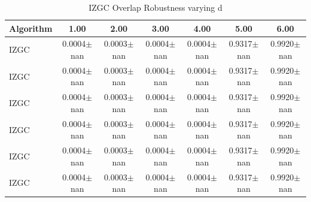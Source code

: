 \begin{table}[ht!]
\centering
\caption{IZGC Overlap Robustness varying d}
\label{tab:izgc_overlap_d}
\begin{tabular*}{\linewidth}{@{} lcccccc @{}}
\toprule
Algorithm & 1.00 & 2.00 & 3.00 & 4.00 & 5.00 & 6.00 \\
\midrule
IZGC & 0.0004$\pm$nan & 0.0003$\pm$nan & 0.0004$\pm$nan & 0.0004$\pm$nan & 0.9317$\pm$nan & 0.9920$\pm$nan \\
IZGC & 0.0004$\pm$nan & 0.0003$\pm$nan & 0.0004$\pm$nan & 0.0004$\pm$nan & 0.9317$\pm$nan & 0.9920$\pm$nan \\
IZGC & 0.0004$\pm$nan & 0.0003$\pm$nan & 0.0004$\pm$nan & 0.0004$\pm$nan & 0.9317$\pm$nan & 0.9920$\pm$nan \\
IZGC & 0.0004$\pm$nan & 0.0003$\pm$nan & 0.0004$\pm$nan & 0.0004$\pm$nan & 0.9317$\pm$nan & 0.9920$\pm$nan \\
IZGC & 0.0004$\pm$nan & 0.0003$\pm$nan & 0.0004$\pm$nan & 0.0004$\pm$nan & 0.9317$\pm$nan & 0.9920$\pm$nan \\
IZGC & 0.0004$\pm$nan & 0.0003$\pm$nan & 0.0004$\pm$nan & 0.0004$\pm$nan & 0.9317$\pm$nan & 0.9920$\pm$nan \\
\bottomrule
\end{tabular*}
\end{table}
